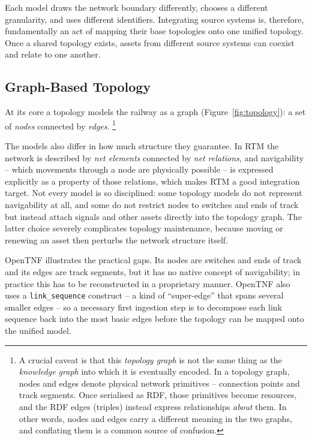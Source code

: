 \documentclass{ceurart}
\begin{document}
Each model draws the network boundary differently, chooses a different
granularity, and uses different identifiers. Integrating source systems is,
therefore, fundamentally an act of mapping their base topologies onto one
unified topology. Once a shared topology exists, assets from different source
systems can coexist and relate to one another.

\subsection{Graph-Based Topology}

At its core a topology models the railway as a graph
(Figure~\ref{fig:topology}): a set of \emph{nodes} connected by \emph{edges}. 
\footnote{A crucial caveat is that this \emph{topology graph} is not the same 
thing as the \emph{knowledge graph} into which it is eventually encoded. In a 
topology graph, nodes and edges denote physical network primitives -- connection 
points and track segments. Once serialised as RDF, those primitives become 
resources, and the RDF edges (triples) instead express relationships \emph{about} 
them. In other words, nodes and edges carry a different meaning in the two graphs, 
and conflating them is a common source of confusion.}

The models also differ in how much structure they guarantee. In RTM the network
is described by \emph{net elements} connected by \emph{net relations}, and
navigability -- which movements through a node are physically possible -- is
expressed explicitly as a property of those relations, which makes RTM a good
integration target. Not every model is so disciplined: some topology models do
not represent navigability at all, and some do not restrict nodes to switches
and ends of track but instead attach signals and other assets directly into the
topology graph. The latter choice severely complicates topology maintenance,
because moving or renewing an asset then perturbs the network structure itself.

OpenTNF illustrates the practical gaps. Its nodes are switches and ends of track
and its edges are track segments, but it has no native concept of navigability;
in practice this has to be reconstructed in a proprietary manner. OpenTNF also
uses a \texttt{link\_sequence} construct -- a kind of ``super-edge'' that spans
several smaller edges -- so a necessary first ingestion step is to decompose each
link sequence back into the most basic edges before the topology can be mapped
onto the unified model.
\end{document}
